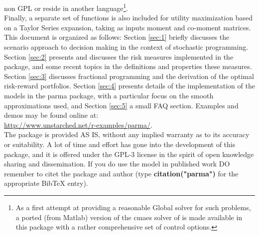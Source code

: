 non GPL or reside in another language\footnote{As a first attempt at
providing a reasonable Global solver for such problems, a ported (from
Matlab) version of the cmaes solver of \citet{Hansen2006} is made
available in this package with a rather comprehensive set of control
options.}. \\
Finally, a separate set of functions is also included for utility maximization
based on a Taylor Series expansion, taking as inputs moment and
co-moment matrices.\\
This document is organized as follows: Section \ref{sec:1} briefly discusses
the scenario approach to decision making in the context of stochastic
programming. Section \ref{sec:2} presents and discusses the risk measures
implemented in the package, and some recent topics in the definitions and
properties these measures. Section \ref{sec:3} discusses fractional
programming and the derivation of the optimal risk-reward portfolios. Section
\ref{sec:4} presents details of the implementation of the models in the parma
package, with a particular focus on the smooth approximations used, and
Section \ref{sec:5} a small FAQ section. Examples and demos may be found
online at:\\
 \url{http://www.unstarched.net/r-examples/parma/}.\\

The package is provided AS IS, without any implied warranty as to its accuracy
or suitability. A lot of time and effort has gone into the development of this
package, and it is offered under the GPL-3 license in the spirit of open
knowledge sharing and dissemination. If you do use the model in published work
DO remember to citet the package and author (type \textbf{citation("parma")} for
the appropriate BibTeX entry).

